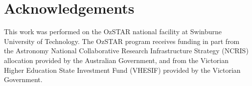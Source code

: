 \documentclass[12pt]{article}
\begin{document}
\newpage %

\section*{Acknowledgements}
\small
This work was performed on the OzSTAR national facility at Swinburne University of Technology. 
The OzSTAR program receives funding in part from the Astronomy National Collaborative Research Infrastructure Strategy (NCRIS) allocation provided by the Australian Government, and from the Victorian Higher Education State Investment Fund (VHESIF) provided by the Victorian Government.




\end{document}
